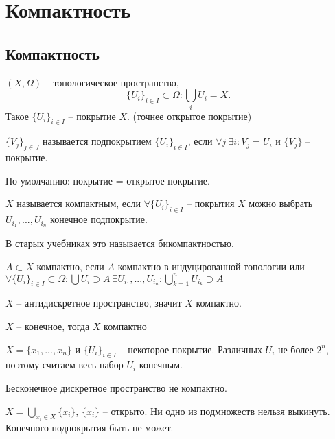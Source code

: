 \documentclass[main]{subfiles}
\begin{document}
\chapter{Компактность}
\section{Компактность}
\begin{definition}
    $(X, \Omega)$ -- топологическое пространство,
    \[\{U_i\}_{i \in I} \subset \Omega: \bigcup_i U_i = X.\]
    Такое $\{U_i\}_{i \in I}$ -- покрытие $X$. (точнее открытое покрытие)

    $\{V_j\}_{j \in J}$ называется подпокрытием $\{U_i\}_{i \in I}$, если
    $\forall j\ \exists i: V_j = U_i$ и $\{V_j\}$ -- покрытие.
\end{definition}

По умолчанию: покрытие = открытое покрытие.

\begin{definition}
    $X$ называется компактным, если $\forall \{U_i\}_{i \in I}$ -- покрытия $X$
    можно выбрать $U_{i_1}, ..., U_{i_n}$ конечное подпокрытие.
\end{definition}

В старых учебниках это называется бикомпактностью.

\begin{definition}
    $A \subset X$ компактно, если $A$ компактно в индуцированной топологии
    или $\forall \{U_i\}_{i \in I} \subset \Omega: \bigcup U_i \supset A \ \exists U_{i_1}, ..., U_{i_n}:
        \bigcup_{k=1}^n U_{i_k} \supset A$
\end{definition}

\begin{example}
    $X$ -- антидискретное пространство, значит $X$ компактно.
\end{example}

\begin{example}
    $X$ -- конечное, тогда $X$ компактно

    $X = \{x_1, ..., x_n\}$ и $\{U_i\}_{i \in I}$ -- некоторое покрытие.
    Различных $U_i$ не более $2^n$, поэтому считаем весь набор $U_i$ конечным.
\end{example}

\begin{example}
    Бесконечное дискретное пространство не компактно.

    $X = \bigcup_{x_i \in X} \{x_i\}$, $\{x_i\}$ -- открыто.
    Ни одно из подмножеств нельзя выкинуть. Конечного подпокрытия быть не может.
\end{example}
\end{document}
